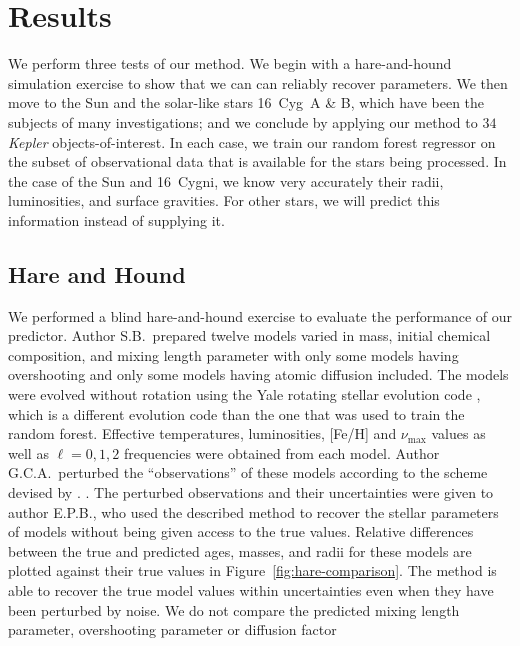\section{Results}
We perform three tests of our method. We begin with a hare-and-hound simulation exercise to show that we can can reliably recover parameters. We then move to the Sun and the solar-like stars 16~Cyg~A \& B, which have been the subjects of many investigations; and we conclude by applying our method to $34$ \emph{Kepler} objects-of-interest. In each case, we train our random forest regressor on the subset of observational data that is available for the stars being processed. In the case of the Sun and 16~Cygni, we know very accurately their radii, luminosities, and surface gravities. For other stars, we will predict this information instead of supplying it. 


\subsection{Hare and Hound} 
\label{sec:hnh}
We performed a blind hare-and-hound exercise to evaluate the performance of our predictor. Author S.B.\ prepared twelve models varied in mass, initial chemical composition, and mixing length parameter with only some models having overshooting and only some models having atomic diffusion included. The models were evolved without rotation using the Yale rotating stellar evolution code \citep[YREC;][]{2008ApSS.316...31D}, which is a different evolution code than the one that was used to train the random forest. Effective temperatures, luminosities, [Fe/H] and $\nu_{\max}$ values as well as ${\ell=0},1,2$ frequencies were obtained from each model. Author G.C.A.\  perturbed the ``observations'' of these models according to the scheme devised by \citet{spaceinn}. . The perturbed observations and their uncertainties were given to author E.P.B.\@, who used the described method to recover the stellar parameters of  models without being given access to the true values. Relative differences between the true and predicted ages, masses, and radii for these models are plotted against their true values in Figure~\ref{fig:hare-comparison}. The method is able to recover the true model values within uncertainties even when they have been perturbed by noise. We do not compare the predicted mixing length parameter, overshooting parameter or diffusion  factor %

